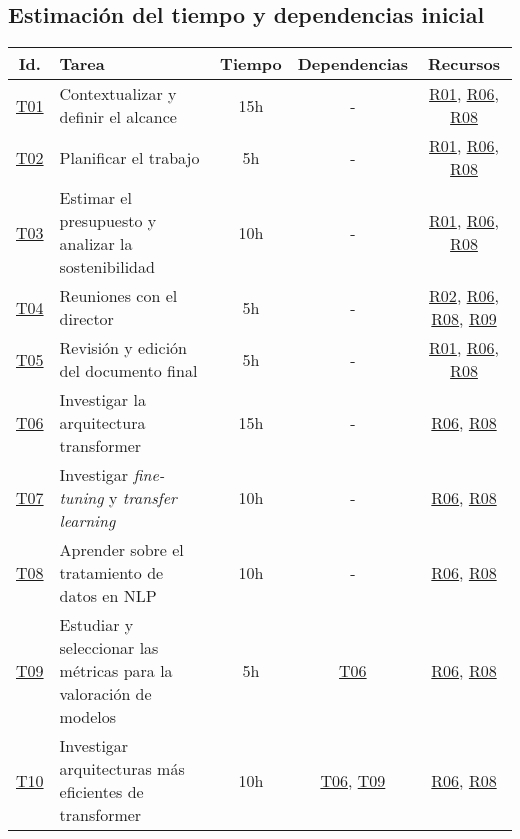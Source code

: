 \begin{landscape}
    \begin{table}
    \section{Estimación del tiempo y dependencias inicial}\label{estimaciontemporal}
    \centering
    \begin{tabular}{ | c | l | c | c | c | }
        \hline
        Id. & Tarea & Tiempo & Dependencias & Recursos \\
        \hline
        \hyperref[T01]{T01} & Contextualizar y definir el alcance & 15h & - & \hyperref[R01]{R01}, \hyperref[R06]{R06}, \hyperref[R08]{R08} \\
        \hline
        \hyperref[T02]{T02} & Planificar el trabajo & 5h & - & \hyperref[R01]{R01}, \hyperref[R06]{R06}, \hyperref[R08]{R08} \\
        \hline
        \hyperref[T03]{T03} & Estimar el presupuesto y analizar la sostenibilidad & 10h & - & \hyperref[R01]{R01}, \hyperref[R06]{R06}, \hyperref[R08]{R08} \\
        \hline
        \hyperref[T04]{T04} & Reuniones con el director & 5h & - & \hyperref[R02]{R02}, \hyperref[R06]{R06}, \hyperref[R08]{R08}, \hyperref[R09]{R09} \\
        \hline
        \hyperref[T05]{T05} & Revisión y edición del documento final & 5h & - & \hyperref[R01]{R01}, \hyperref[R06]{R06}, \hyperref[R08]{R08} \\
        \hline
        \hyperref[T06]{T06} & Investigar la arquitectura transformer & 15h & - & \hyperref[R06]{R06}, \hyperref[R08]{R08} \\
        \hline
        \hyperref[T07]{T07} & Investigar \textit{fine-tuning} y \textit{transfer learning} & 10h & - & \hyperref[R06]{R06}, \hyperref[R08]{R08} \\
        \hline
        \hyperref[T08]{T08} & Aprender sobre el tratamiento de datos en NLP & 10h & - & \hyperref[R06]{R06}, \hyperref[R08]{R08} \\
        \hline
        \hyperref[T09]{T09} & Estudiar y seleccionar las métricas para la valoración de
        modelos & 5h & \hyperref[T06]{T06} & \hyperref[R06]{R06}, \hyperref[R08]{R08} \\
        \hline
        \hyperref[T10]{T10} & Investigar arquitecturas más eficientes de transformer & 10h & \hyperref[T06]{T06}, \hyperref[T09]{T09} & \hyperref[R06]{R06}, \hyperref[R08]{R08} \\

\end{tabular}
\end{table}
\end{landscape}
